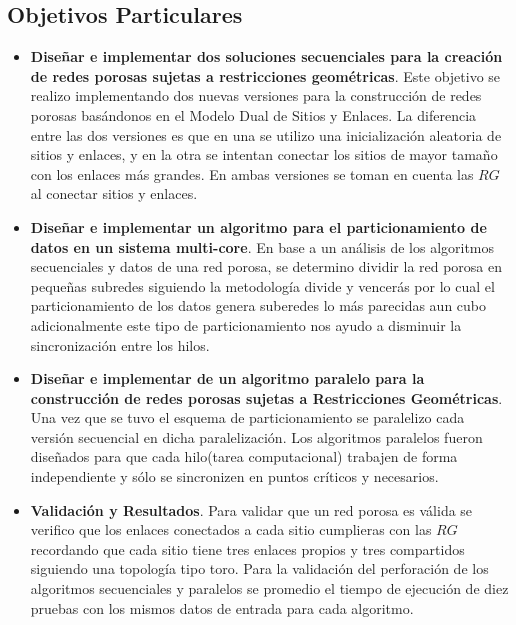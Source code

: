 \subsection{Objetivos Particulares}
\begin{itemize}
\item \textbf{Diseñar e implementar dos soluciones secuenciales para la creación de redes porosas sujetas a restricciones geométricas}. Este objetivo se realizo implementando dos nuevas versiones para la construcción de redes porosas basándonos en el Modelo Dual de Sitios y Enlaces. La diferencia entre las dos versiones es que en una se utilizo una inicialización aleatoria de sitios y enlaces, y en la otra se intentan conectar los sitios de mayor tamaño con los enlaces más grandes. En ambas versiones se toman en cuenta las $RG$ al conectar sitios y enlaces.


\item \textbf{Diseñar e implementar un algoritmo para el particionamiento de datos en un sistema multi-core}. En base a un análisis de los algoritmos secuenciales y datos de una red porosa, se determino dividir la red porosa en pequeñas subredes siguiendo la metodología divide y vencerás por lo cual el particionamiento de los datos genera suberedes lo más parecidas aun cubo adicionalmente este tipo de particionamiento nos ayudo a disminuir la sincronización entre los hilos.  

\item \textbf{Diseñar e implementar de un algoritmo paralelo para la construcción de redes porosas sujetas a Restricciones Geométricas}. Una vez que se tuvo el esquema de particionamiento se paralelizo cada versión secuencial en dicha paralelización. Los algoritmos paralelos fueron diseñados para que cada hilo(tarea computacional) trabajen de forma independiente y sólo se sincronizen en puntos críticos y necesarios.

\item \textbf{Validación y Resultados}. Para validar que un red porosa es válida se verifico que los enlaces conectados a cada sitio cumplieras con las $RG$ recordando que cada sitio tiene tres enlaces propios y tres compartidos siguiendo una topología tipo toro. Para la validación del perforación de los algoritmos secuenciales y paralelos se promedio el tiempo de ejecución de diez pruebas con los mismos datos de entrada para cada algoritmo. 
\end{itemize}


